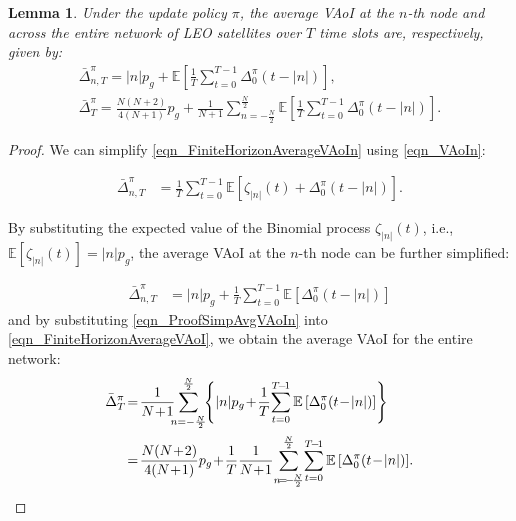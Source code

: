 \documentclass[lettersize,journal]{IEEEtran}
\newtheorem{lemma}{Lemma}
\begin{document}
    \begin{lemma}
    \label{Lemma_AvgVAoI}
    Under the update policy $\pi$, the average VAoI at the $n$-th node and across the entire network of LEO satellites over $T$ time slots are, respectively, given by:
    \begin{gather}
        \bar{\Delta}_{n,T}^\pi \!=\! |n|p_g \!+ \! \mathbb{E} \left[ \frac{1}{T} \! \sum_{t=0}^{T\!-\!1}  \Delta_0^\pi(t\!-\!|n|) \right], \\
        \label{eqn_FirstSimpAvgVAoI}
        \bar{\Delta}_T^\pi \!=\!  \frac{N(N\!+\!2)}{4(N\!+\!1)}p_g \!+\! \frac{1}{N\!+\!1} \!\!\sum_{n=-\frac{N}{2}}^{\frac{N}{2}} \! \mathbb{E} \left[ \frac{1}{T} \! \sum_{t=0}^{T\!-\!1}  \Delta_0^\pi(t\!-\!|n|) \right]\!.
    \end{gather}
    \end{lemma}

    \begin{proof}
    We can simplify \eqref{eqn_FiniteHorizonAverageVAoIn} using \eqref{eqn_VAoIn}:

    \begin{align}
        \bar{\Delta}_{n,T}^\pi &\!=\! \frac{1}{T} \sum_{t=0}^{T\!-\!1} \mathbb{E} \left[ \zeta_{|n|}(t) \!+\! \Delta_0^\pi \left(t\!-\!|n|\right) \right].
    \end{align}

    By substituting the expected value of the Binomial process $\zeta_{|n|}(t)$, i.e., $\mathbb{E} \left[ \zeta_{|n|}(t) \right] = |n|p_g$, the average VAoI at the $n$-th node can be further simplified:

    \begin{align}
        \label{eqn_ProofSimpAvgVAoIn}
        \bar{\Delta}_{n,T}^\pi &\!=\! |n| p_g \!+\! \frac{1}{T} \!\sum_{t=0}^{T\!-\!1} \mathbb{E} \left[ \Delta_0^\pi(t\!-\!|n|) \right]
    \end{align}
    and by substituting \eqref{eqn_ProofSimpAvgVAoIn} into \eqref{eqn_FiniteHorizonAverageVAoI}, we obtain the average VAoI for the entire network:
    \begin{align}
        \bar{\Delta}_T^\pi &\!=\!  \frac{1}{N\!+\!1} \!\!\!\sum_{n=-\frac{N}{2}}^{\frac{N}{2}} \!\!\left\{ |n| p_g \!+\! \frac{1}{T} \!\sum_{t=0}^{T\!-\!1} \mathbb{E} \left[ \Delta_0^\pi(t\!-\!|n|) \right] \right\} \\
        & \!=\!  \frac{N(N\!+\!2)}{4(N\!+\!1)}p_g \!+\! \frac{1}{T} \frac{1}{N\!+\!1} \!\sum_{n\!=\!-\!\frac{N}{2}}^{\frac{N}{2}} \! \sum_{t=0}^{T\!-\!1} \mathbb{E} \left[ \Delta_0^\pi(t\!-\!|n|) \right]\!. \notag \qedhere
    \end{align} 
    \end{proof}
\end{document}

